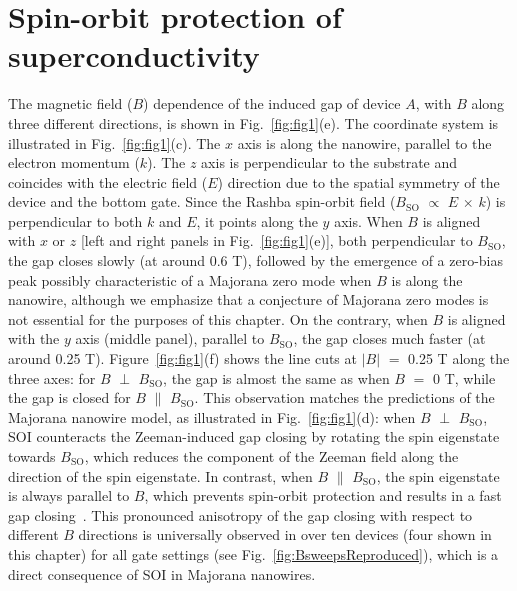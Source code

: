 \section{Spin-orbit protection of superconductivity}
The magnetic field ($B$) dependence of the induced gap of device $A$, with $B$ along three different directions, is shown in Fig.~\ref{fig:fig1}(e).
The coordinate system is illustrated in Fig.~\ref{fig:fig1}(c).
The $x$ axis is along the nanowire, parallel to the electron momentum ($k$).
The $z$ axis is perpendicular to the substrate and coincides with the electric field ($E$) direction due to the spatial symmetry of the device and the bottom gate.
Since the Rashba spin-orbit field ($B_{\mathrm{SO}}$ $\propto$ $E$ $\times$ $k$) is perpendicular to both $k$ and $E$, it points along the $y$ axis.
When $B$ is aligned with $x$ or $z$ [left and right panels in Fig.~\ref{fig:fig1}(e)], both perpendicular to $B_{\mathrm{SO}}$, the gap closes \mbox{slowly} (at around 0.6 T), followed by the emergence of a zero-bias peak possibly characteristic of a Majorana zero mode when $B$ is along the nanowire, although we emphasize that a conjecture of Majorana zero modes is not essential for the purposes of this chapter.
On the contrary, when $B$ is aligned with the $y$ axis (middle panel), parallel to $B_{\mathrm{SO}}$, the gap closes much faster (at around 0.25 T).
Figure~\ref{fig:fig1}(f) shows the line cuts at $|B|$ $=$ 0.25 T along the three axes: for $B$ $\perp$ $B_{\mathrm{SO}}$, the gap is almost the same as when $B$ $=$ 0 T, while the gap is closed for $B$ $\parallel$ $B_{\mathrm{SO}}$.
This observation matches the predictions of the Majorana nanowire model, as illustrated in Fig.~\ref{fig:fig1}(d): when $B$ $\perp$ $B_{\mathrm{SO}}$, SOI counteracts the Zeeman-induced gap closing by rotating the spin eigenstate towards $B_{\mathrm{SO}}$, which reduces the component of the Zeeman field along the direction of the spin eigenstate.
In contrast, when $B$ $\parallel$ $B_{\mathrm{SO}}$, the spin eigenstate is always parallel to $B$, which prevents spin-orbit protection and results in a fast gap closing~\cite{Osca2014,Rex2014}.
This pronounced anisotropy of the gap closing with respect to different $B$ directions is universally observed in over ten devices (four shown in this chapter) for all gate settings (see Fig.~\ref{fig:BsweepsReproduced}), which is a direct consequence of SOI in Majorana nanowires.

